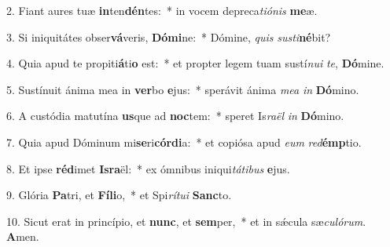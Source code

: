 2. Fiant aures tuæ \textbf{in}ten\textbf{dén}tes:~*  in vocem depreca\textit{ti}\textit{ó}\textit{nis} \textbf{me}æ.\

3. Si iniquitátes obser\textbf{vá}veris, \textbf{Dó}\textbf{mi}ne:~*  Dómine, \textit{quis} \textit{sus}\textit{ti}\textbf{né}bit?\

4. Quia apud te propiti\textbf{á}ti\textbf{o} est:~*  et propter legem tuam sustí\textit{nu}\textit{i} \textit{te}, \textbf{Dó}mine.\

5. Sustínuit ánima mea in \textbf{ver}bo \textbf{e}jus:~*  sperávit ánima \textit{me}\textit{a} \textit{in} \textbf{Dó}mino.\

6. A custódia matutína \textbf{us}que ad \textbf{noc}tem:~*  speret Is\textit{ra}\textit{ël} \textit{in} \textbf{Dó}mino.\

7. Quia apud Dóminum mi\textbf{se}ri\textbf{cór}\textbf{di}a:~*  et copiósa apud \textit{e}\textit{um} \textit{red}\textbf{émp}tio.\

8. Et ipse \textbf{réd}imet \textbf{Is}\textbf{ra}ël:~*  ex ómnibus iniqui\textit{tá}\textit{ti}\textit{bus} \textbf{e}jus.\

9. Glória \textbf{Pa}tri, et \textbf{Fí}\textbf{li}o,~*  et Spi\textit{rí}\textit{tu}\textit{i} \textbf{Sanc}to.\

10. Sicut erat in princípio, et \textbf{nunc}, et \textbf{sem}per,~*  et in sǽcula sæ\textit{cu}\textit{ló}\textit{rum}. \textbf{A}men.\

